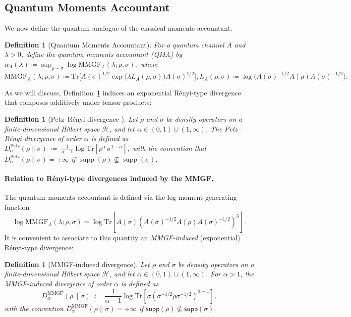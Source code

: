 \documentclass[11pt]{article}
\def\Tr{\mathrm{Tr}}
\def\supp{\mathsf{supp}}
\theoremstyle{plain}
\newtheorem{definition}[theo]{Definition}
\theoremstyle{remark}
\begin{document}
\subsection{Quantum Moments Accountant}
\label{sec:qma-def}

We now define the quantum analogue of the classical moments accountant.

\begin{definition}[Quantum Moments Accountant]
For a quantum channel $A$ and $\lambda>0$, define the quantum moments
accountant (QMA) by
$
    \alpha_A(\lambda)
    \coloneqq
    \sup_{\rho\sim\sigma}
    \log \mathrm{MMGF}_A(\lambda;\rho,\sigma),
$
where
$
    \mathrm{MMGF}_A(\lambda;\rho,\sigma)
    \coloneqq
    \Tr\!\big[
        A(\sigma)^{1/2}
        \exp\!\big(\lambda L_A(\rho,\sigma)\big)
        A(\sigma)^{1/2}
    \big], 
    L_A(\rho,\sigma)
    \coloneqq
    \log\!\big(
        A(\sigma)^{-1/2} A(\rho) A(\sigma)^{-1/2}
    \big).
$
\label{def:qma}
\end{definition}
As we will discuss, Definition~\ref{def:qma} induces an exponential R\'enyi-type divergence that composes
additively under tensor products:

\begin{definition}[Petz--R\'enyi divergence \cite{P85,P86}]
Let $\rho$ and $\sigma$ be density operators on a finite-dimensional Hilbert space
$\mathcal{H}$, and let $\alpha\in(0,1)\cup(1,\infty)$.
The \emph{Petz--R\'enyi divergence} of order $\alpha$ is defined as
$
D^{\mathrm{Petz}}_\alpha(\rho\|\sigma)
\;\coloneqq\;
\frac{1}{\alpha-1}
\log
\Tr\!\left[
\rho^\alpha\,\sigma^{1-\alpha}
\right],
$
with the convention that $D^{\mathrm{Petz}}_\alpha(\rho\|\sigma)=+\infty$ if
$\operatorname{supp}(\rho)\nsubseteq \operatorname{supp}(\sigma)$.
\end{definition}



\paragraph{Relation to R\'enyi-type divergences induced by the MMGF.}
The quantum moments accountant is defined via the log moment generating function
\[
\log \mathrm{MMGF}_A(\lambda;\rho,\sigma)
=
\log \Tr\!\left[
A(\sigma)\left(A(\sigma)^{-1/2}A(\rho)A(\sigma)^{-1/2}\right)^{\lambda}
\right].
\]
It is convenient to associate to this quantity an \emph{MMGF-induced} (exponential) R\'enyi-type divergence:


\begin{definition}[MMGF-induced divergence]
Let $\rho$ and $\sigma$ be density operators on a finite-dimensional Hilbert space
$\mathcal{H}$, and let $\alpha\in(0,1)\cup(1,\infty)$.
For $\alpha>1$, the \emph{MMGF-induced divergence} of order $\alpha$ is defined as 
\begin{equation}
\label{eq:mmgf-induced-divergence}
D^{\mathrm{MMGF}}_{\alpha}(\rho\|\sigma)
\;\coloneqq\;
\frac{1}{\alpha-1}\log \Tr\!\left[
\sigma\left(\sigma^{-1/2}\rho\sigma^{-1/2}\right)^{\alpha-1}
\right],
\end{equation}
with the convention $D^{\mathrm{MMGF}}_{\alpha}(\rho\|\sigma)=+\infty$ if $\supp(\rho)\nsubseteq\supp(\sigma)$.
\end{definition}
\end{document}
